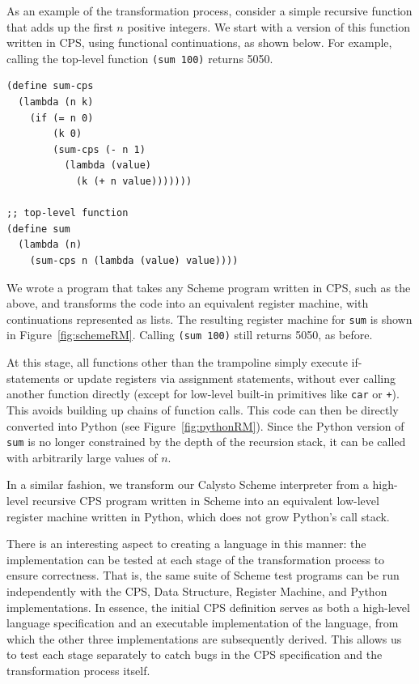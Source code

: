 \documentclass[acmsmall,screen,authorversion]{acmart}
\begin{document}
As an example of the transformation process, consider a simple recursive
function that adds up the first $n$ positive integers.  We start with a version
of this function written in CPS, using functional continuations, as shown
below.  For example, calling the top-level function \texttt{(sum 100)} returns
5050.

{\small
\begin{verbatim}
(define sum-cps
  (lambda (n k)
    (if (= n 0)
        (k 0)
        (sum-cps (- n 1)
          (lambda (value)
            (k (+ n value)))))))

;; top-level function
(define sum
  (lambda (n)
    (sum-cps n (lambda (value) value))))

\end{verbatim}
}

\noindent
We wrote a program that takes any Scheme program written in CPS, such as the
above, and transforms the code into an equivalent register machine, with
continuations represented as lists.  The resulting register machine for
\texttt{sum} is shown in Figure~\ref{fig:schemeRM}.  Calling \texttt{(sum 100)}
still returns 5050, as before.

At this stage, all functions other than the trampoline simply execute
if-statements or update registers via assignment statements, without ever
calling another function directly (except for low-level built-in primitives
like \texttt{car} or \texttt{+}).  This avoids building up chains of function
calls.  This code can then be directly converted into Python (see
Figure~\ref{fig:pythonRM}).  Since the Python version of \texttt{sum} is no
longer constrained by the depth of the recursion stack, it can be called with
arbitrarily large values of $n$.

In a similar fashion, we transform our Calysto Scheme interpreter from a
high-level recursive CPS program written in Scheme into an equivalent low-level
register machine written in Python, which does not grow Python's call stack.

There is an interesting aspect to creating a language in this manner: the
implementation can be tested at each stage of the transformation process to
ensure correctness. That is, the same suite of Scheme test programs can be run
independently with the CPS, Data Structure, Register Machine, and Python
implementations. In essence, the initial CPS definition serves as both a
high-level language specification and an executable implementation of the
language, from which the other three implementations are subsequently
derived. This allows us to test each stage separately to catch bugs in the CPS
specification and the transformation process itself.
\end{document}
